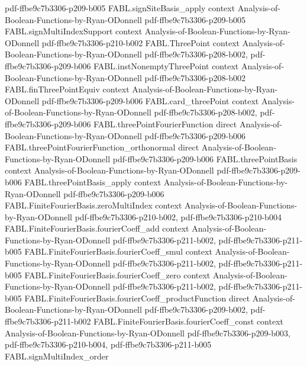 \begin{theorem}
{    pdf-ffbe9c7b3306-p209-b005}
\proofstep
  {FABL.signSiteBasis_apply}
  {context}
  {Analysis-of-Boolean-Functions-by-Ryan-ODonnell}
  {pdf-ffbe9c7b3306-p209-b005}
\proofstep
  {FABL.signMultiIndexSupport}
  {context}
  {Analysis-of-Boolean-Functions-by-Ryan-ODonnell}
  {pdf-ffbe9c7b3306-p210-b002}
\proofstep
  {FABL.ThreePoint}
  {context}
  {Analysis-of-Boolean-Functions-by-Ryan-ODonnell}
  {pdf-ffbe9c7b3306-p208-b002,
    pdf-ffbe9c7b3306-p209-b006}
\proofstep
  {FABL.instNonemptyThreePoint}
  {context}
  {Analysis-of-Boolean-Functions-by-Ryan-ODonnell}
  {pdf-ffbe9c7b3306-p208-b002}
\proofstep
  {FABL.finThreePointEquiv}
  {context}
  {Analysis-of-Boolean-Functions-by-Ryan-ODonnell}
  {pdf-ffbe9c7b3306-p209-b006}
\proofstep
  {FABL.card_threePoint}
  {context}
  {Analysis-of-Boolean-Functions-by-Ryan-ODonnell}
  {pdf-ffbe9c7b3306-p208-b002,
    pdf-ffbe9c7b3306-p209-b006}
\proofstep
  {FABL.threePointFourierFunction}
  {direct}
  {Analysis-of-Boolean-Functions-by-Ryan-ODonnell}
  {pdf-ffbe9c7b3306-p209-b006}
\proofstep
  {FABL.threePointFourierFunction_orthonormal}
  {direct}
  {Analysis-of-Boolean-Functions-by-Ryan-ODonnell}
  {pdf-ffbe9c7b3306-p209-b006}
\proofstep
  {FABL.threePointBasis}
  {context}
  {Analysis-of-Boolean-Functions-by-Ryan-ODonnell}
  {pdf-ffbe9c7b3306-p209-b006}
\proofstep
  {FABL.threePointBasis_apply}
  {context}
  {Analysis-of-Boolean-Functions-by-Ryan-ODonnell}
  {pdf-ffbe9c7b3306-p209-b006}
\proofstep
  {FABL.FiniteFourierBasis.zeroMultiIndex}
  {context}
  {Analysis-of-Boolean-Functions-by-Ryan-ODonnell}
  {pdf-ffbe9c7b3306-p210-b002,
    pdf-ffbe9c7b3306-p210-b004}
\proofstep
  {FABL.FiniteFourierBasis.fourierCoeff_add}
  {context}
  {Analysis-of-Boolean-Functions-by-Ryan-ODonnell}
  {pdf-ffbe9c7b3306-p211-b002,
    pdf-ffbe9c7b3306-p211-b005}
\proofstep
  {FABL.FiniteFourierBasis.fourierCoeff_smul}
  {context}
  {Analysis-of-Boolean-Functions-by-Ryan-ODonnell}
  {pdf-ffbe9c7b3306-p211-b002,
    pdf-ffbe9c7b3306-p211-b005}
\proofstep
  {FABL.FiniteFourierBasis.fourierCoeff_zero}
  {context}
  {Analysis-of-Boolean-Functions-by-Ryan-ODonnell}
  {pdf-ffbe9c7b3306-p211-b002,
    pdf-ffbe9c7b3306-p211-b005}
\proofstep
  {FABL.FiniteFourierBasis.fourierCoeff_productFunction}
  {direct}
  {Analysis-of-Boolean-Functions-by-Ryan-ODonnell}
  {pdf-ffbe9c7b3306-p209-b002,
    pdf-ffbe9c7b3306-p211-b002}
\proofstep
  {FABL.FiniteFourierBasis.fourierCoeff_const}
  {context}
  {Analysis-of-Boolean-Functions-by-Ryan-ODonnell}
  {pdf-ffbe9c7b3306-p209-b003,
    pdf-ffbe9c7b3306-p210-b004,
    pdf-ffbe9c7b3306-p211-b005}
\proofstep
  {FABL.signMultiIndex_order}

\end{theorem}
